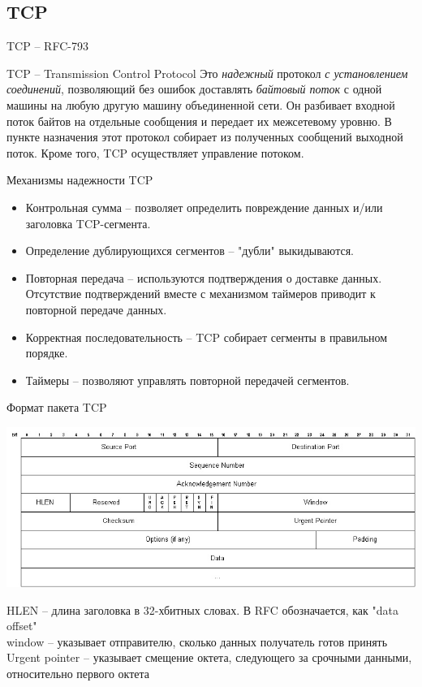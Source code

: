 \subsection{TCP}
\begin{frame}{TCP -- RFC-793}
	\begin{block}{TCP -- Transmission Control Protocol}
		Это {\itshape надежный} протокол {\itshape с установлением соединений}, позволяющий без ошибок 
		доставлять {\itshape байтовый поток} с одной машины на любую другую машину объединенной сети.
		Он разбивает входной поток байтов на отдельные сообщения и передает их межсетевому уровню. 
		В пункте назначения этот протокол собирает из полученных сообщений выходной поток. 
		Кроме того,  TCP осуществляет управление потоком.
	\end{block}
\end{frame}

\begin{frame}{Механизмы надежности TCP}
	\begin{itemize}
		\item Контрольная сумма -- позволяет определить повреждение данных и/или заголовка TCP-сегмента.
		\item Определение дублирующихся сегментов -- "дубли" выкидываются.
		\item Повторная передача -- используются подтверждения о доставке данных. Отсутствие подтверждений вместе с механизмом таймеров приводит к повторной передаче данных.
		\item Корректная последовательность -- TCP собирает сегменты в правильном порядке.
		\item Таймеры -- позволяют управлять повторной передачей сегментов.
	\end{itemize}
\end{frame}


\begin{frame}{Формат пакета TCP}
	\begin{center}
		\includegraphics[width=1\textwidth]{04-tcp_header.png}
	\end{center}
	\tiny
	HLEN -- длина заголовка в 32-хбитных словах. В RFC обозначается, как "data offset"\\
	window -- указывает отправителю, сколько данных получатель готов принять\\
	Urgent pointer -- указывает смещение октета, следующего за срочными данными, относительно первого октета
	\normalsize
\end{frame}

